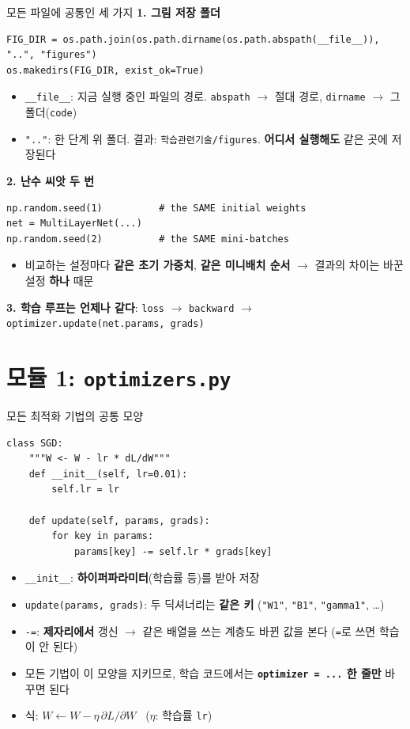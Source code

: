 \documentclass[aspectratio=169,11pt]{beamer}
\newcommand{\code}[1]{\texttt{#1}}
\begin{document}
\begin{frame}[fragile]{모든 파일에 공통인 세 가지}
\textbf{1. 그림 저장 폴더}
\begin{lstlisting}
FIG_DIR = os.path.join(os.path.dirname(os.path.abspath(__file__)), "..", "figures")
os.makedirs(FIG_DIR, exist_ok=True)
\end{lstlisting}
\small
\begin{itemize}
\item \code{\_\_file\_\_}: 지금 실행 중인 파일의 경로. \code{abspath} $\to$ 절대 경로, \code{dirname} $\to$ 그 폴더(\code{code})
\item \code{".."}: 한 단계 위 폴더. 결과: \code{학습관련기술/figures}. \textbf{어디서 실행해도} 같은 곳에 저장된다
\end{itemize}
\normalsize
\textbf{2. 난수 씨앗 두 번}
\begin{lstlisting}
np.random.seed(1)          # the SAME initial weights
net = MultiLayerNet(...)
np.random.seed(2)          # the SAME mini-batches
\end{lstlisting}
\small
\begin{itemize}
\item 비교하는 설정마다 \textbf{같은 초기 가중치}, \textbf{같은 미니배치 순서} $\to$ 결과의 차이는 바꾼 설정 \textbf{하나} 때문
\end{itemize}
\textbf{3. 학습 루프는 언제나 같다}: \code{loss} $\to$ \code{backward} $\to$ \code{optimizer.update(net.params, grads)}
\end{frame}

\section{모듈 1: \texttt{optimizers.py}}

\begin{frame}[fragile]{모든 최적화 기법의 공통 모양}
\begin{lstlisting}
class SGD:
    """W <- W - lr * dL/dW"""
    def __init__(self, lr=0.01):
        self.lr = lr

    def update(self, params, grads):
        for key in params:
            params[key] -= self.lr * grads[key]
\end{lstlisting}
\begin{itemize}
\item \code{\_\_init\_\_}: \textbf{하이퍼파라미터}(학습률 등)를 받아 저장
\item \code{update(params, grads)}: 두 딕셔너리는 \textbf{같은 키} (\code{"W1"}, \code{"B1"}, \code{"gamma1"}, \ldots)
\item \code{-=}: \textbf{제자리에서} 갱신 $\to$ 같은 배열을 쓰는 계층도 바뀐 값을 본다 (\code{=}로 쓰면 학습이 안 된다)
\item 모든 기법이 이 모양을 지키므로, 학습 코드에서는 \textbf{\code{optimizer = ...} 한 줄만} 바꾸면 된다
\item 식: $W \leftarrow W - \eta\,\partial L/\partial W$ \ ($\eta$: 학습률 \code{lr})
\end{itemize}
\end{frame}
\end{document}
